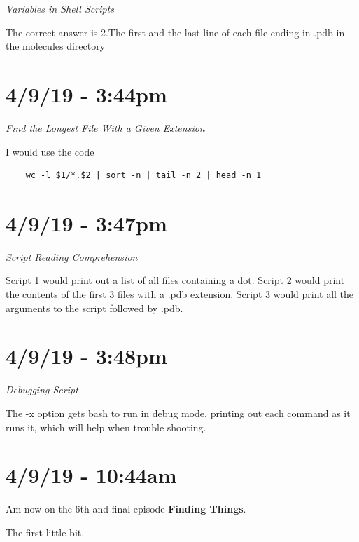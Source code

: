 \documentclass{article}
\begin{document}
\textit{Variables in Shell Scripts}

The correct answer is 2.The first and the last line of each file ending in .pdb in the molecules directory

\section*{4/9/19 - 3:44pm}

\textit{Find the Longest File With a Given Extension}

I would use the code \begin{verbatim}
    wc -l $1/*.$2 | sort -n | tail -n 2 | head -n 1
\end{verbatim}

\section*{4/9/19 - 3:47pm}

\textit{Script Reading Comprehension}

Script 1 would print out a list of all files containing a dot. Script 2 would print the contents of the first 3 files with a .pdb extension. Script 3 would print all the arguments to the script followed by .pdb.

\section*{4/9/19 - 3:48pm}

\textit{Debugging Script}

The -x option gets bash to run in debug mode, printing out each command as it runs it, which will help when trouble shooting.

\section*{4/9/19 - 10:44am}

Am now on the 6th and final episode \textbf{Finding Things}.

The first little bit.
\end{document}

